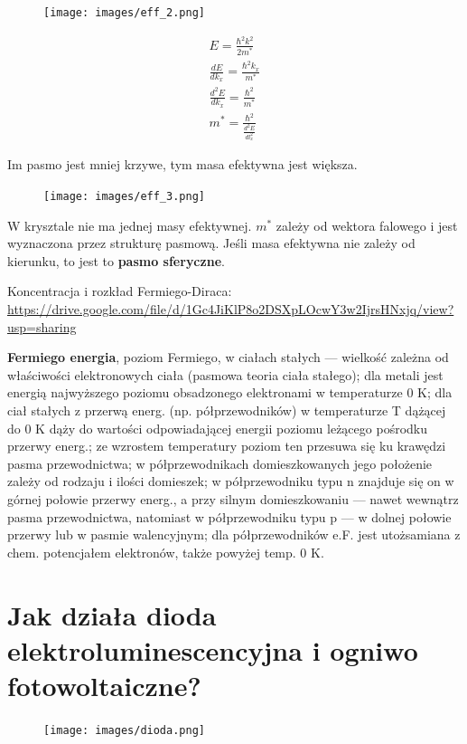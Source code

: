 \documentclass{article}
\begin{document}
\begin{figure}[H]
    \centering
    \texttt{[image: images/eff\_2.png]}
\end{figure}

\begin{gather*}
    E=\frac{\hbar^2k^2}{2m^*}\\
    \frac{dE}{dk_x}=\frac{\hbar^2k_x}{m^*}\\
    \frac{d^2E}{dk_x}=\frac{\hbar^2}{m^*}\\
    m^*=\frac{\hbar^2}{\frac{d^2E}{dl_x^2}}
\end{gather*}

Im pasmo jest mniej krzywe, tym masa efektywna jest większa.
\begin{figure}[H]
    \centering
    \texttt{[image: images/eff\_3.png]}
\end{figure}

W krysztale nie ma jednej masy efektywnej. $m^*$ zależy od wektora falowego i jest wyznaczona przez strukturę pasmową. Jeśli masa efektywna nie zależy od kierunku, to jest to \textbf{pasmo sferyczne}.

Koncentracja i rozkład Fermiego-Diraca: \url{https://drive.google.com/file/d/1Gc4JiKlP8o2DSXpLOcwY3w2IjrsHNxjq/view?usp=sharing}

\textbf{Fermiego energia}, poziom Fermiego, w ciałach stałych — wielkość zależna od właściwości elektronowych ciała (pasmowa teoria ciała stałego);
dla metali jest energią najwyższego poziomu obsadzonego elektronami w temperaturze 0 K; dla ciał stałych z przerwą energ. (np. półprzewodników) w temperaturze T dążącej do 0 K dąży do wartości odpowiadającej energii poziomu leżącego pośrodku przerwy energ.; ze wzrostem temperatury poziom ten przesuwa się ku krawędzi pasma przewodnictwa; w półprzewodnikach domieszkowanych jego położenie zależy od rodzaju i ilości domieszek; w półprzewodniku typu n znajduje się on w górnej połowie przerwy energ., a przy silnym domieszkowaniu — nawet wewnątrz pasma przewodnictwa, natomiast w półprzewodniku typu p — w dolnej połowie przerwy lub w pasmie walencyjnym; dla półprzewodników e.F. jest utożsamiana z chem. potencjałem elektronów, także powyżej temp. 0 K.

\section{Jak działa dioda elektroluminescencyjna i ogniwo fotowoltaiczne?}

\begin{figure}[H]
    \centering
    \texttt{[image: images/dioda.png]}
\end{figure}
\end{document}
